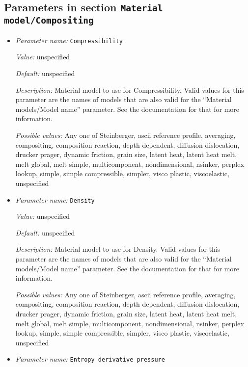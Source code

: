 \subsection{Parameters in section \tt Material model/Compositing}
\label{parameters:Material_20model/Compositing}

\begin{itemize}
\item {\it Parameter name:} {\tt Compressibility}
\label{parameters:Material model/Compositing/Compressibility}
\label{parameters:Material_20model/Compositing/Compressibility}


{\it Value:} unspecified


{\it Default:} unspecified


{\it Description:} Material model to use for Compressibility. Valid values for this parameter are the names of models that are also valid for the ``Material models/Model name'' parameter. See the documentation for that for more information.


{\it Possible values:} Any one of Steinberger, ascii reference profile, averaging, compositing, composition reaction, depth dependent, diffusion dislocation, drucker prager, dynamic friction, grain size, latent heat, latent heat melt, melt global, melt simple, multicomponent, nondimensional, nsinker, perplex lookup, simple, simple compressible, simpler, visco plastic, viscoelastic, unspecified
\item {\it Parameter name:} {\tt Density}
\label{parameters:Material model/Compositing/Density}
\label{parameters:Material_20model/Compositing/Density}


{\it Value:} unspecified


{\it Default:} unspecified


{\it Description:} Material model to use for Density. Valid values for this parameter are the names of models that are also valid for the ``Material models/Model name'' parameter. See the documentation for that for more information.


{\it Possible values:} Any one of Steinberger, ascii reference profile, averaging, compositing, composition reaction, depth dependent, diffusion dislocation, drucker prager, dynamic friction, grain size, latent heat, latent heat melt, melt global, melt simple, multicomponent, nondimensional, nsinker, perplex lookup, simple, simple compressible, simpler, visco plastic, viscoelastic, unspecified
\item {\it Parameter name:} {\tt Entropy derivative pressure}
\label{parameters:Material model/Compositing/Entropy derivative pressure}
\label{parameters:Material_20model/Compositing/Entropy_20derivative_20pressure}



\end{itemize}
